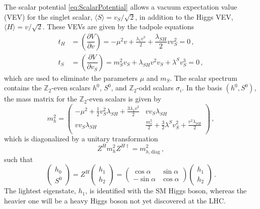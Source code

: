 \documentclass[12pt,letterpaper]{article}
\begin{document}
The scalar potential \eqref{eq:ScalarPotential} allows a vacuum expectation value (VEV) for the singlet scalar, $\langle S \rangle = v_S/\sqrt{2}$, in addition to the Higgs VEV, $\langle H \rangle =v/\sqrt{2}$. These VEVs are given by the tadpole equations
\begin{align}
\label{eq:tadpoles}
t_{H} &= \left(\dfrac{\partial V}{\partial v}\right)
= -\mu ^2 v +\frac{\lambda _1 v^3}{2} + \dfrac{\lambda_{SH}}{2} v v_S^2=0\,, \\
t_S &= \left(\dfrac{\partial V}{\partial v_S}\right)
= m_S^2 v_S + \lambda_{SH}v^2 v_S+ \lambda^S v_S^3=0\,,
\end{align}
which are used to eliminate the parameters $\mu$ and $m_S$. The scalar spectrum contains the $\mathbb{Z}_2$-even scalars $h^0$, $S^0$, and  $\mathbb{Z}_2$-odd scalars $\sigma_i$. In the basis $(h^0,S^0)$, the mass matrix for the $\mathbb{Z}_2$-even scalars is given by
\begin{equation}
\label{eq:mh-matrix}
m_h^2=
\left(
\begin{array}{cc}
 -\mu ^2+\frac{1}{2} v_S^2 \lambda_{SH}+\frac{3 \lambda _1 v^2}{2} & v v_S
   \lambda_{SH} \\
 v v_S \lambda_{SH} & \frac{m_s^2}{2}+\frac{3}{2} \lambda ^S v_S^2+\frac{v^2
   \lambda_{SH}}{2} \\
\end{array}
\right)\,,
\end{equation}
which is diagonalized by a unitary transformation
\begin{equation}
\label{eq:ZH-matrix}
Z^H m_h^2Z^{H\dagger} = m_{h,\text{diag}}^{2}\,,
\end{equation}
such that
\begin{equation}
\begin{pmatrix}
h_0 \\ S^0
\end{pmatrix} =
Z^H
\begin{pmatrix}
h_1 \\ h_2
\end{pmatrix}
 =
\begin{pmatrix}
\cos\alpha & \sin\alpha \\
-\sin\alpha & \cos\alpha 
\end{pmatrix}
\begin{pmatrix}
h_1 \\ h_2
\end{pmatrix}\,. \label{eq:Higgs-mixing}
\end{equation}
The lightest eigenstate, $h_1$, is identified with the SM Higgs boson, whereas the heavier one will be a heavy Higgs boson not yet discovered at the LHC. 
\end{document}

